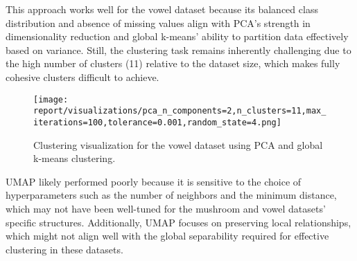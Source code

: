 This approach works well for the vowel dataset because its balanced class distribution and absence of missing values align with PCA’s strength in dimensionality reduction and global k-means’ ability to partition data effectively based on variance. Still, the clustering task remains inherently challenging due to the high number of clusters (11) relative to the dataset size, which makes fully cohesive clusters difficult to achieve.

\begin{figure}[h!]
    \centering
    \texttt{[image: report/visualizations/pca\_n\_components=2,n\_clusters=11,max\_iterations=100,tolerance=0.001,random\_state=4.png]}
    \caption{Clustering visualization for the vowel dataset using PCA and global k-means clustering.}
    \label{fig:vowel_clustering}
\end{figure}

UMAP likely performed poorly because it is sensitive to the choice of hyperparameters such as the number of neighbors and the minimum distance, which may not have been well-tuned for the mushroom and vowel datasets' specific structures. Additionally, UMAP focuses on preserving local relationships, which might not align well with the global separability required for effective clustering in these datasets.
